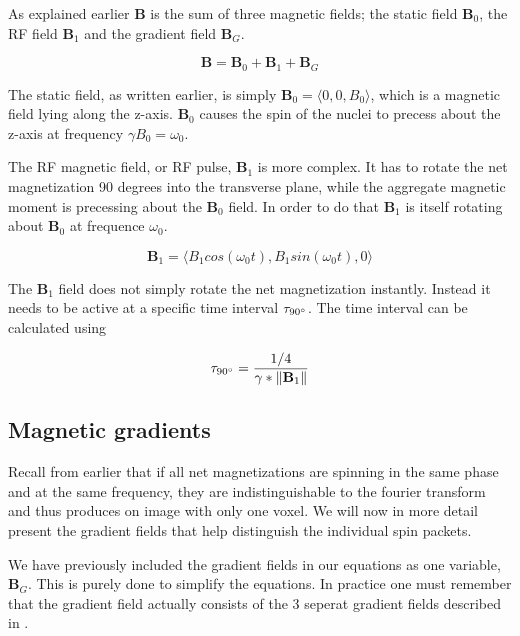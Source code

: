 

As explained earlier $\mathbf{B}$ is the sum of three magnetic fields;
the static field $\mathbf{B}_0$, the RF field $\mathbf{B}_1$ and the
gradient field $\mathbf{B}_G$.

\begin{displaymath}
  \mathbf{B} = \mathbf{B}_0 + \mathbf{B}_1 + \mathbf{B}_G
\end{displaymath}

The static field, as written earlier, is simply $\mathbf{B}_0 =
\langle 0, 0, B_0 \rangle$, which is a magnetic field lying along the
z-axis. $\mathbf{B}_0$ causes the spin of the nuclei to precess about
the z-axis at frequency $\gamma B_0 = \omega_0$.

The RF magnetic field, or RF pulse, $\mathbf{B}_1$ is more complex. It
has to rotate the net magnetization 90 degrees into the transverse
plane, while the aggregate magnetic moment is precessing about the
$\mathbf{B}_0$ field. In order to do that $\mathbf{B}_1$ is itself
rotating about $\mathbf{B}_0$ at frequence $\omega_0$.

\begin{displaymath}
  \mathbf{B}_1 = \langle B_1 cos(\omega_0 t), B_1 sin(\omega_0 t), 0\rangle
\end{displaymath}

The $\mathbf{B}_1$ field does not simply rotate the net magnetization
instantly. Instead it needs to be active at a specific time interval
$\tau_{90^\circ}$. The time interval can be calculated using

\begin{displaymath}
  \tau_{90^\circ} = \frac{1 / 4}{\gamma * \|\mathbf{B}_1\|}
\end{displaymath}

\subsection{Magnetic gradients}

Recall from earlier that if all net magnetizations are spinning in the
same phase and at the same frequency, they are indistinguishable to
the fourier transform and thus produces on image with only one
voxel. We will now in more detail present the gradient fields that
help distinguish the individual spin packets.

We have previously included the gradient fields in our equations as
one variable, $\mathbf{B}_G$. This is purely done to simplify the
equations. In practice one must remember that the gradient field
actually consists of the 3 seperat gradient fields described in
.

